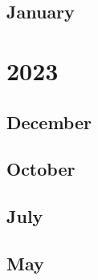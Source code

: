 \documentclass[12pt]{article}
\begin{document}
\subsection{January}
\begin{refsection}
    \nocite{deepseek-ai_deepseek-v2_2024}
    \printbibliography[heading=none]
\end{refsection}


\newpage
\section{2023}
\subsection{December}
\begin{refsection}
    \nocite{gu_mamba_2024}
    \printbibliography[heading=none]
\end{refsection}

\subsection{October}
\begin{refsection}
    \nocite{jiang_mistral_2023}
    \printbibliography[heading=none]
\end{refsection}

\subsection{July}
\begin{refsection}
    \nocite{touvron_llama_2023}
    \printbibliography[heading=none]
\end{refsection}

\subsection{May}
\begin{refsection}
    \nocite{sun_principle-driven_2023}
    \nocite{anil_palm_2023}
    \nocite{peng_rwkv_2023}
    \nocite{rafailov_direct_2024}
    \nocite{yao_tree_2023}
    \printbibliography[heading=none]
\end{refsection}
\end{document}
